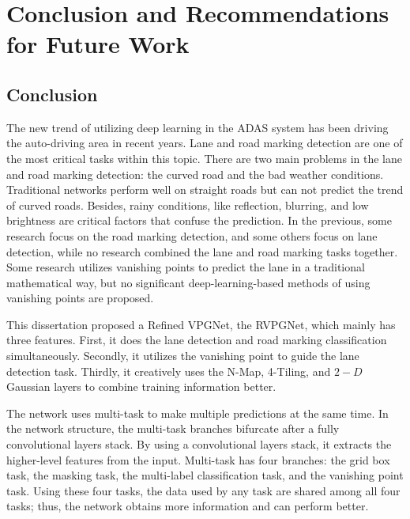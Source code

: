 
\chapter{Conclusion and Recommendations for Future Work}
\label{cha:conclusion}
\begin{spacing}{1.5}
\setlength{\parskip}{0.3in}

\section{Conclusion}

The new trend of utilizing deep learning in the ADAS system has been driving the auto-driving area in recent years. Lane and road marking detection are one of the most critical tasks within this topic. There are two main problems in the lane and road marking detection: the curved road and the bad weather conditions. Traditional networks perform well on straight roads but can not predict the trend of curved roads. Besides, rainy conditions, like reflection, blurring, and low brightness are critical factors that confuse the prediction. In the previous, some research focus on the road marking detection, and some others focus on lane detection, while no research combined the lane and road marking tasks together. Some research utilizes vanishing points to predict the lane in a traditional mathematical way, but no significant deep-learning-based methods of using vanishing points are proposed.

This dissertation proposed a Refined VPGNet, the RVPGNet, which mainly has three features. First, it does the lane detection and road marking classification simultaneously. Secondly, it utilizes the vanishing point to guide the lane detection task. Thirdly, it creatively uses the N-Map, 4-Tiling, and $2-D$ Gaussian layers to combine training information better.

The network uses multi-task to make multiple predictions at the same time. In the network structure, the multi-task branches bifurcate after a fully convolutional layers stack. By using a convolutional layers stack, it extracts the higher-level features from the input. Multi-task has four branches: the grid box task, the masking task, the multi-label classification task, and the vanishing point task. Using these four tasks, the data used by any task are shared among all four tasks; thus, the network obtains more information and can perform better.


\end{spacing}
